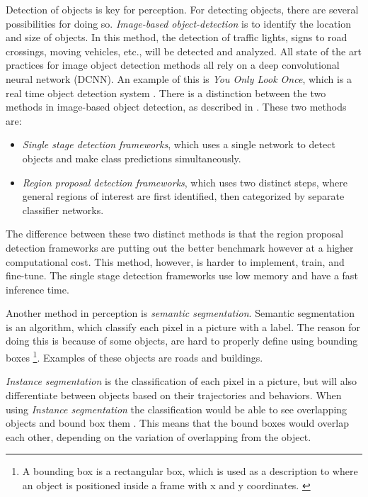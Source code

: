 Detection of objects is key for perception.
For detecting objects, there are several possibilities for doing so.
\textit{Image-based object-detection} is to identify the location and size of objects.
In this method, the detection of traffic lights, signs to road crossings, moving vehicles, etc., will be detected and analyzed.
All state of the art practices for image object detection methods all rely on a deep convolutional neural network (DCNN).
An example of this is \textit{You Only Look Once}, which is a real time object detection system \cite{objectDetection_yolo:_02-10}.
There is a distinction between the two methods in image-based object detection, as described in \cite{yurtsever_survey_2019}. These two methods are:

\begin{itemize}
    \item \textit{Single stage detection frameworks}, which uses a single network to detect objects and make class predictions simultaneously.
    \item \textit{Region proposal detection frameworks}, which uses two distinct steps, where general regions of interest are first identified, then categorized by separate classifier networks.
\end{itemize}

The difference between these two distinct methods is that the region proposal detection frameworks are putting out the better benchmark however at a higher computational cost.
This method, however, is harder to implement, train, and fine-tune.
The single stage detection frameworks use low memory and have a fast inference time.

Another method in perception is \textit{semantic segmentation}.
Semantic segmentation is an algorithm, which classify each pixel in a picture with a label.
The reason for doing this is because of some objects, are hard to properly define using bounding boxes \footnote{ A bounding box is a rectangular box, which is used as a description to where an object is positioned inside a frame with x and y coordinates. \cite{d2l_12.3._10.10}}.
Examples of these objects are roads and buildings.

\textit{Instance segmentation} is the classification of each pixel in a picture, but will also differentiate between objects based on their trajectories and behaviors. When using \textit{Instance segmentation} the classification would be able to see overlapping objects and bound box them \cite{mittal_instance_2019}. This means that the bound boxes would overlap each other, depending on the variation of overlapping from the object.

